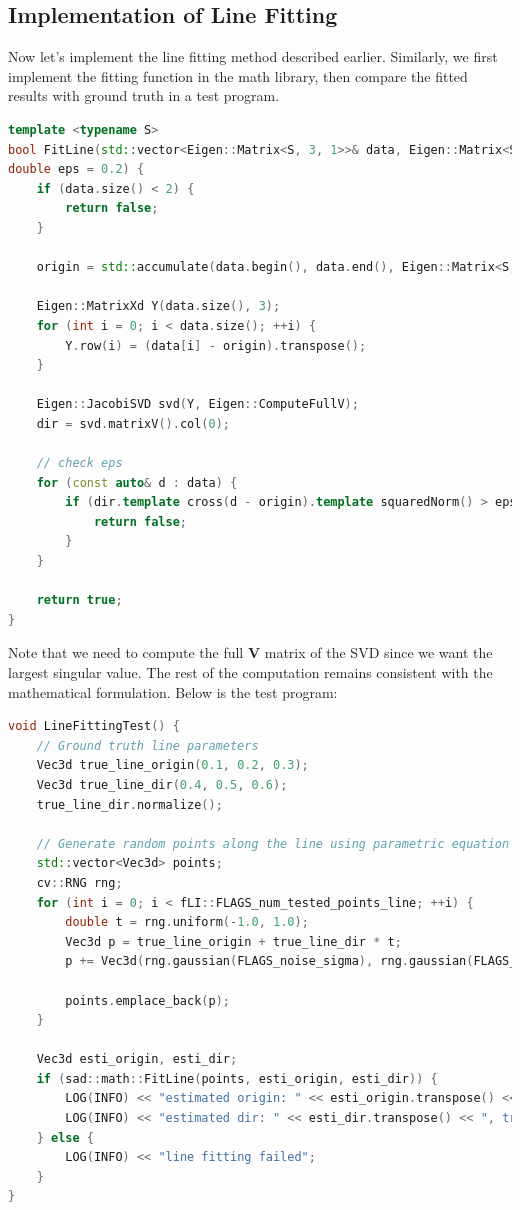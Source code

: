 \subsection{Implementation of Line Fitting}
Now let's implement the line fitting method described earlier. Similarly, we first implement the fitting function in the math library, then compare the fitted results with ground truth in a test program.

\begin{lstlisting}[language=c++,caption=src/common/math\_utils.h]
template <typename S>
bool FitLine(std::vector<Eigen::Matrix<S, 3, 1>>& data, Eigen::Matrix<S, 3, 1>& origin, Eigen::Matrix<S, 3, 1>& dir,
double eps = 0.2) {
	if (data.size() < 2) {
		return false;
	}
	
	origin = std::accumulate(data.begin(), data.end(), Eigen::Matrix<S, 3, 1>::Zero().eval()) / data.size();
	
	Eigen::MatrixXd Y(data.size(), 3);
	for (int i = 0; i < data.size(); ++i) {
		Y.row(i) = (data[i] - origin).transpose();
	}
	
	Eigen::JacobiSVD svd(Y, Eigen::ComputeFullV);
	dir = svd.matrixV().col(0);
	
	// check eps
	for (const auto& d : data) {
		if (dir.template cross(d - origin).template squaredNorm() > eps) {
			return false;
		}
	}
	
	return true;
}
\end{lstlisting}

Note that we need to compute the full $\mathbf{V}$ matrix of the SVD since we want the largest singular value. The rest of the computation remains consistent with the mathematical formulation. Below is the test program:

\begin{lstlisting}[language=c++,caption=src/ch5/linear\_fitting.cc]
void LineFittingTest() {
	// Ground truth line parameters
	Vec3d true_line_origin(0.1, 0.2, 0.3);
	Vec3d true_line_dir(0.4, 0.5, 0.6);
	true_line_dir.normalize();
	
	// Generate random points along the line using parametric equation
	std::vector<Vec3d> points;
	cv::RNG rng;
	for (int i = 0; i < fLI::FLAGS_num_tested_points_line; ++i) {
		double t = rng.uniform(-1.0, 1.0);
		Vec3d p = true_line_origin + true_line_dir * t;
		p += Vec3d(rng.gaussian(FLAGS_noise_sigma), rng.gaussian(FLAGS_noise_sigma), rng.gaussian(FLAGS_noise_sigma));
		
		points.emplace_back(p);
	}
	
	Vec3d esti_origin, esti_dir;
	if (sad::math::FitLine(points, esti_origin, esti_dir)) {
		LOG(INFO) << "estimated origin: " << esti_origin.transpose() << ", true: " << true_line_origin.transpose();
		LOG(INFO) << "estimated dir: " << esti_dir.transpose() << ", true: " << true_line_dir.transpose();
	} else {
		LOG(INFO) << "line fitting failed";
	}
}
\end{lstlisting}

